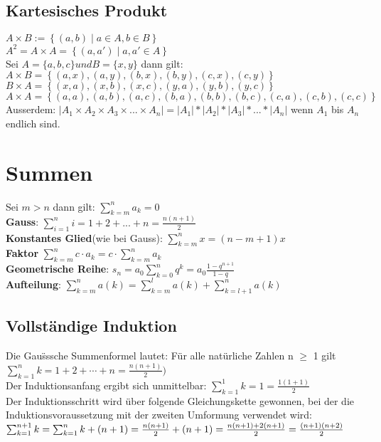 \documentclass[11pt]{article}
\begin{document}
\subsection{Kartesisches Produkt}
$A \times B := \left\{ (a, b) \mid a \in A, b \in B \right\}$ \\
$A^2 = A \times A = \left\{ (a, a') \mid a, a' \in A \right\}$ \\
Sei $A=\{ a, b, c \} und B=\{ x, y \}$ dann gilt: \\
$A \times B = \left\{ (a,x), (a,y), (b,x), (b,y), (c,x), (c,y) \right\}$ \\
$B \times A = \left\{ (x,a), (x,b), (x,c), (y,a), (y,b), (y,c) \right\}$ \\
$A \times A = \left\{ (a,a), (a,b), (a,c), (b,a), (b,b), (b,c), (c,a), (c,b), (c,c) \right\}$\\
Ausserdem: $\mathopen| A_1 \times A_2 \times A_3 \times ... \times A_n \mathclose| = \mathopen|A_1\mathclose|*\mathopen|A_2\mathclose|*\mathopen|A_3\mathclose|*...*\mathopen|A_n\mathclose|$ wenn $A_1$ bis $A_n$ endlich sind.

\section{Summen}
Sei $m>n$ dann gilt: $\sum_{k=m}^{n}a_k = 0$\\
{\bfseries Gauss}: $\sum_{i=1}^n{i} = 1+2+...+n = \frac{n(n+1)}{2}$ \\
{\bfseries Konstantes Glied}(wie bei Gauss): $\sum_{k=m}^{n}x = (n-m+1)x$ \\
{\bfseries Faktor} $\sum_{k=m}^{n}c\cdot a_k = c\cdot \sum_{k=m}^{n}a_k$ \\
{\bfseries Geometrische Reihe}: $s_n=a_0\sum_{k=0}^{n} q^k = a_0\frac{1-q^{n+1}}{1-q}$ \\
{\bfseries Aufteilung}: $\sum_{k=m}^n a(k) = \sum_{k=m}^l a(k) + \sum_{k=l+1}^n a(k)$

\subsection{Vollst{\"a}ndige Induktion}
Die Gau{\"ss}sche Summenformel lautet: F{\"u}r alle nat{\"u}rliche Zahlen n $\geq$ 1 gilt
$\sum^n_{k=1} k = 1+2+\cdots+n = \frac{n(n+1)}{2})$\\
Der Induktionsanfang ergibt sich unmittelbar: $\sum^1_{k=1} k = 1 = \frac{1(1+1)}{2}$ \\
Der Induktionsschritt wird {\"u}ber folgende Gleichungskette gewonnen, bei der die Induktionsvoraussetzung mit der zweiten Umformung verwendet wird: $\sum^{n+1}_{k=1} k = \sum^n_{k=1} k + (n+1) = \frac{n(n+1)}{2}+(n+1)\\ =\frac{n(n+1)+2(n+1)}{2} = \frac{(n+1)(n+2)}{2}$
\end{document}
